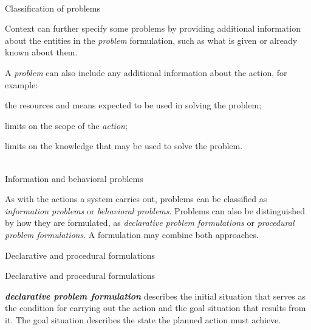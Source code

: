 \begin{frame}{\\Classification of problems}
    \topline
	\justifying

    \bigskip

    Context can further specify some problems by providing additional information about the entities in the \textit{problem} formulation, such as what is given or already known about them.\\
    \bigskip

    A \textit{problem} can also include any additional information about the action, for example:
    \begin{textitemize}
        \item the resources and means expected to be used in solving the problem;
        \item limits on the scope of the \textit{action};
        \item limits on the knowledge that may be used to solve the problem.
    \end{textitemize}
\end{frame}

\begin{frame}{\\Information and behavioral problems}
	\topline
	\justifying

    As with the actions a system carries out, problems can be classified as \textit{information problems} or \textit{behavioral problems}.
    Problems can also be distinguished by how they are formulated, as \textit{declarative problem formulations} or \textit{procedural problem formulations}. A formulation may combine both approaches.
\end{frame}

\begin{frame}{Declarative and procedural formulations}
	\topline
	\justifying

    \begin{SCn}
    \end{SCn}
\end{frame}

\begin{frame}{Declarative and procedural formulations}
	\topline
	\justifying

    \textbf{\textit{declarative problem formulation}} describes the initial situation that serves as the condition for carrying out the action and the goal situation that results from it. The goal situation describes the state the planned action must achieve.
\end{frame}

